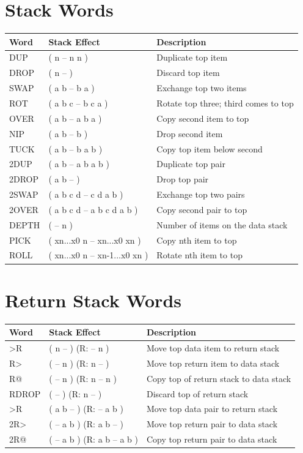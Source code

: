 \section*{Stack Words}
\begin{longtable}{>{\ttfamily}lp{4.5cm}p{7cm}}
\toprule
\normalfont Word & Stack Effect & Description \\
\midrule
\endhead
\bottomrule
\endfoot
DUP     & ( n -- n n )        & Duplicate top item \\
DROP    & ( n -- )            & Discard top item \\
SWAP    & ( a b -- b a )      & Exchange top two items \\
ROT     & ( a b c -- b c a )  & Rotate top three; third comes to top \\
OVER    & ( a b -- a b a )    & Copy second item to top \\
NIP     & ( a b -- b )        & Drop second item \\
TUCK    & ( a b -- b a b )    & Copy top item below second \\
2DUP    & ( a b -- a b a b )  & Duplicate top pair \\
2DROP   & ( a b -- )          & Drop top pair \\
2SWAP   & ( a b c d -- c d a b ) & Exchange top two pairs \\
2OVER   & ( a b c d -- a b c d a b ) & Copy second pair to top \\
DEPTH   & ( -- n )            & Number of items on the data stack \\
PICK    & ( xn...x0 n -- xn...x0 xn ) & Copy nth item to top \\
ROLL    & ( xn...x0 n -- xn-1...x0 xn ) & Rotate nth item to top \\
\end{longtable}

\section*{Return Stack Words}
\begin{longtable}{>{\ttfamily}lp{4.5cm}p{7cm}}
\toprule
\normalfont Word & Stack Effect & Description \\
\midrule
\endhead
\bottomrule
\endfoot
>R      & ( n -- ) (R: -- n )        & Move top data item to return stack \\
R>      & ( -- n ) (R: n -- )        & Move top return item to data stack \\
R@      & ( -- n ) (R: n -- n )      & Copy top of return stack to data stack \\
RDROP   & ( -- ) (R: n -- )          & Discard top of return stack \\
2>R     & ( a b -- ) (R: -- a b )    & Move top data pair to return stack \\
2R>     & ( -- a b ) (R: a b -- )    & Move top return pair to data stack \\
2R@     & ( -- a b ) (R: a b -- a b ) & Copy top return pair to data stack \\
\end{longtable}

